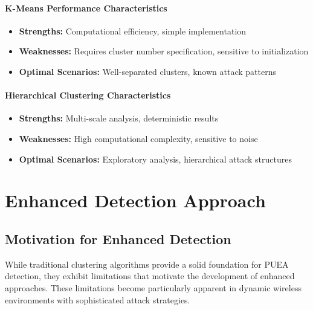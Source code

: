 \subsubsection{K-Means Performance Characteristics}
\begin{itemize}
\item \textbf{Strengths:} Computational efficiency, simple implementation
\item \textbf{Weaknesses:} Requires cluster number specification, sensitive to initialization
\item \textbf{Optimal Scenarios:} Well-separated clusters, known attack patterns
\end{itemize}

\subsubsection{Hierarchical Clustering Characteristics}
\begin{itemize}
\item \textbf{Strengths:} Multi-scale analysis, deterministic results
\item \textbf{Weaknesses:} High computational complexity, sensitive to noise
\item \textbf{Optimal Scenarios:} Exploratory analysis, hierarchical attack structures
\end{itemize}


\chapter{Enhanced Detection Approach}

\section{Motivation for Enhanced Detection}
While traditional clustering algorithms provide a solid foundation for PUEA detection, they exhibit limitations that motivate the development of enhanced approaches. These limitations become particularly apparent in dynamic wireless environments with sophisticated attack strategies.

